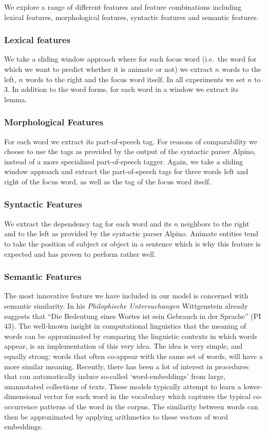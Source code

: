 \documentclass[a4paper,UKenglish]{oasics}
\begin{document}
We explore a range of different features and feature combinations
including lexical features, morphological features, syntactic features
and semantic features.

\subsubsection{Lexical features}
We take a sliding window approach where for each focus word (i.e.\ the
word for which we want to predict whether it is animate or not) we
extract $n$ words to the left, $n$ words to the right and the focus
word itself. In all experiments we set $n$ to 3. In addition to the
word forms, for each word in a window we extract its lemma.

\subsubsection{Morphological Features}
For each word we extract its part-of-speech tag. For reasons of
comparability we choose to use the tags as provided by the output of
the syntactic parser Alpino, instead of a more specialized
part-of-speech tagger. Again, we take a sliding window approach and
extract the part-of-speech tags for three words left and right of the focus word, as well as the tag of the focus word itself.

\subsubsection{Syntactic Features}
We extract the dependency tag for each word and its $n$ neighbors to
the right and to the left as provided by the syntactic parser
Alpino. Animate entities tend to take the position of subject or
object in a sentence which is why this feature is expected and has
proven to perform rather well.


\subsubsection{Semantic Features} The most innovative feature we have
included in our model is concerned with semantic similarity. In his
\textit{Philophische Untersuchungen} Wittgenstein already suggests
that ``Die Bedeutung eines Wortes ist sein Gebrauch in der Sprache''
(PI 43). The well-known insight in computational linguistics that the
meaning of words can be approximated by comparing the linguistic
contexts in which words appear, is an implementation of this very
idea. The idea is very simple, and equally strong: words that often
co-appear with the same set of words, will have a more similar
meaning. Recently, there has been a lot of interest in procedures that
can automatically induce so-called `word-embeddings' from large,
unannotated collections of texts. These models typically attempt to
learn a lower-dimensional vector for each word in the vocabulary which
captures the typical co-occurrence patterns of the word in the
corpus. The similarity between words can then be approximated by
applying arithmetics to these vectors of word embeddings.
\end{document}
